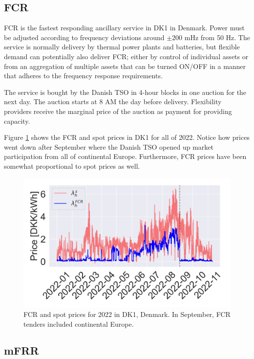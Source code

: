 \documentclass[lettersize,journal]{IEEEtran}
\begin{document}
\subsection{FCR}

FCR is the fastest responding ancillary service in DK1 in Denmark. Power must be adjusted according to frequency deviations around $\pm 200$ mHz from 50 Hz. The service is normally delivery by thermal power plants and batteries, but flexible demand can potentially also deliver FCR; either by control of individual assets or from an aggregation of multiple assets that can be turned ON/OFF in a manner that adheres to the frequency response requirements.

The service is bought by the Danish TSO in 4-hour blocks in one auction for the next day. The auction starts at 8 AM the day before delivery. Flexibility providers receive the marginal price of the auction as payment for providing capacity.

Figure \ref{fig:fcr_prices_2022} shows the FCR and spot prices in DK1 for all of 2022. Notice how prices went down after September where the Danish TSO opened up market participation from all of continental Europe. Furthermore, FCR prices have been somewhat proportional to spot prices as well.

\begin{figure}[!t]
    \centering
    \includegraphics[width=\columnwidth]{figures/fcr_prices.png}
    \caption{FCR and spot prices for 2022 in DK1, Denmark. In September, FCR tenders included continental Europe.}
    \label{fig:fcr_prices_2022}
\end{figure}

\subsection{mFRR}
\end{document}
